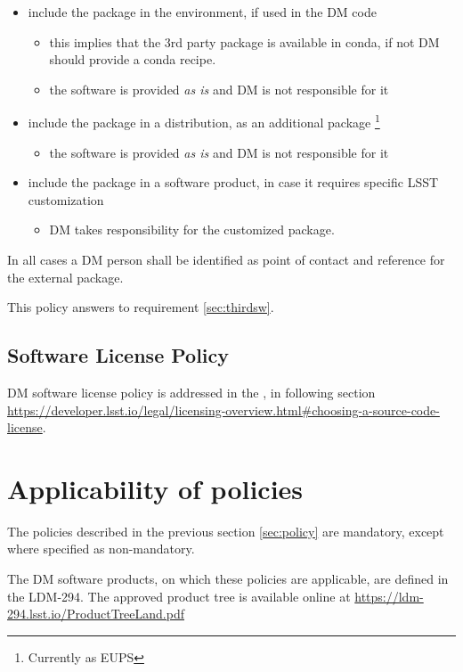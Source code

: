 \begin{itemize}
\item include the package in the environment, if used in the DM code
    \begin{itemize}
    \item this implies that the 3rd party package is available in conda, if not DM should provide a conda recipe.
    \item the software is provided \textit{as is} and DM is not responsible for it
    \end{itemize}
\item include the package in a distribution, as an additional  package \footnote{Currently as EUPS}
    \begin{itemize}
    \item the software is provided \textit{as is} and DM is not responsible for it
    \end{itemize}
\item include the package in a software product, in case it requires specific LSST customization
    \begin{itemize}
    \item DM takes responsibility for the customized package.
    \end{itemize}
\end{itemize}

In all cases a DM person shall be identified as point of contact and reference for the external package.

This policy answers to requirement \ref{sec:thirdsw}.


\subsection{Software License Policy} \label{sec:licensepolicy}

DM software license policy is addressed in the , in following section
\url{https://developer.lsst.io/legal/licensing-overview.html#choosing-a-source-code-license}.


\newpage
\section{Applicability of policies } \label{sec:applicability}

The policies described in the previous section \ref{sec:policy} are mandatory, except where specified as non-mandatory.

The \gls{DM} software products, on which these policies are applicable, are defined in the LDM-294.
The approved product tree is available online at \url{https://ldm-294.lsst.io/ProductTreeLand.pdf}




